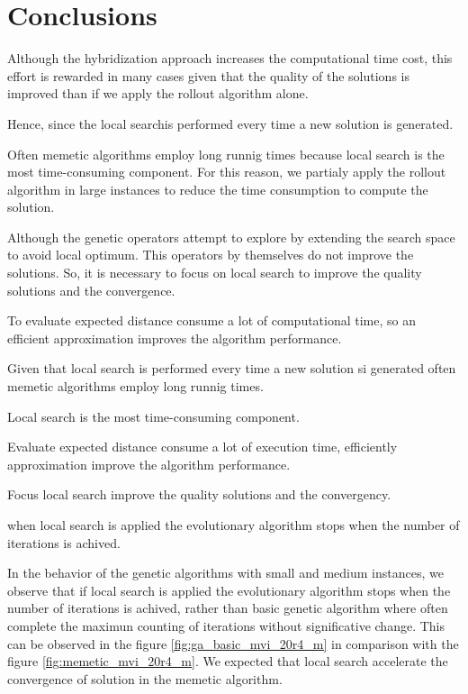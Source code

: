 \chapter{Conclusions}
\label{chap:conclusions}


Although the hybridization approach increases the computational time cost, this effort is rewarded in many cases given that the quality of the solutions is improved than if we apply the rollout algorithm alone. 

Hence, since the local searchis performed every time a new solution is generated.

Often memetic algorithms employ long runnig times because local search is the most time-consuming component. For this reason, we partialy apply the rollout algorithm in large instances to reduce the time consumption to compute the solution.

Although the genetic operators attempt to explore by extending the search space to avoid local optimum. This operators by themselves do not improve the solutions. So, it is necessary to focus on local search to improve the quality solutions and the convergence.

To evaluate expected distance consume a lot of computational time, so an efficient approximation improves the algorithm performance.

Given that local search is performed every time a new solution si generated often memetic algorithms employ long runnig times. 

Local search is the most time-consuming component.

Evaluate expected distance consume a lot of execution time, efficiently approximation improve the algorithm performance.

Focus local search improve the quality solutions and the convergency.

when local search is applied the evolutionary algorithm stops when the number of iterations is achived.

In the behavior of the genetic algorithms with small and medium instances, we observe that if local search is applied the evolutionary algorithm stops when the number of iterations is achived, rather than basic genetic algorithm where often complete the maximun counting of iterations without significative change. This can be observed in the figure \ref{fig:ga_basic_mvi_20r4_m} in comparison with the figure \ref{fig:memetic_mvi_20r4_m}. We expected that local search accelerate the convergence of solution in the memetic algorithm.

